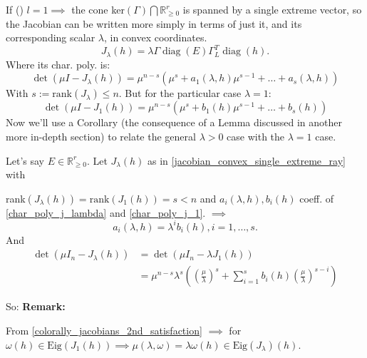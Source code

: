 If () $l = 1 \implies$ the cone ker$(\Gamma) \bigcap \mathbb{R}^r_{\geq 0}$ is spanned by a single extreme vector, so the Jacobian can be written more simply in terms of just it, and its corresponding scalar $\lambda$, in convex coordinates.
\begin{equation}\label{jacobian_convex_single_extreme_ray}
	J_\lambda(h)=\lambda \Gamma \operatorname{diag}(E)\Gamma_L^T\operatorname{diag}(h).
\end{equation}
Where its char. poly. is:
\begin{equation}\label{char_poly_j_lambda}
	\det(\mu I-J_\lambda(h))=\mu^{n-s}(\mu^s+a_1(\lambda,h)\mu^{s-1}+\ldots+a_s(\lambda,h))
\end{equation}
With $s := \text{rank}(J_\lambda) \leq n$.
But for the particular case $\lambda = 1$:
\begin{equation}\label{char_poly_j_1}
	\det(\mu I-J_1(h))=\mu^{n-s}(\mu^s+b_1(h)\mu^{s-1}+\ldots+b_s(h))
\end{equation}
Now we'll use a Corollary (the consequence of a Lemma discussed in another more in-depth section) to relate the general $\lambda > 0$ case with the $\lambda = 1$ case.
\begin{corollary}
	Let's say $E \in \mathbb{R}^r_{\geq 0}$. Let $J_\lambda(h)$ as in \ref{jacobian_convex_single_extreme_ray} with

	rank$(J_{\lambda}(h))=\mathrm{rank}(J_{1}(h))=s<n$ and $a_i(\lambda,h), b_i(h)$ coeff. of \ref{char_poly_j_lambda} and \ref{char_poly_j_1}. $\implies$
	\begin{equation}\label{colorally_jacobians_1st_satisfaction}
		a_i(\lambda,h)=\lambda^ib_i(h),i=1,\ldots,s.
	\end{equation}
	And
	\begin{equation}\label{colorally_jacobians_2nd_satisfaction}
		\begin{aligned}\det(\mu I_n-J_\lambda(h))&=\det(\mu I_n-\lambda J_1(h))\\&=\mu^{n-s}\lambda^s\left(\left(\frac{\mu}{\lambda}\right)^s+\sum_{i=1}^sb_i(h)\left(\frac{\mu}{\lambda}\right)^{s-i}\right)
		\end{aligned}
	\end{equation}
\end{corollary}
So: \textbf{Remark: }

 From \ref{colorally_jacobians_2nd_satisfaction} $\implies$ for $\omega(h) \in \text{Eig}(J_1(h)) \implies \mu(\lambda, \omega) = \lambda \omega(h) \in \text{Eig}(J_\lambda)(h)$.

